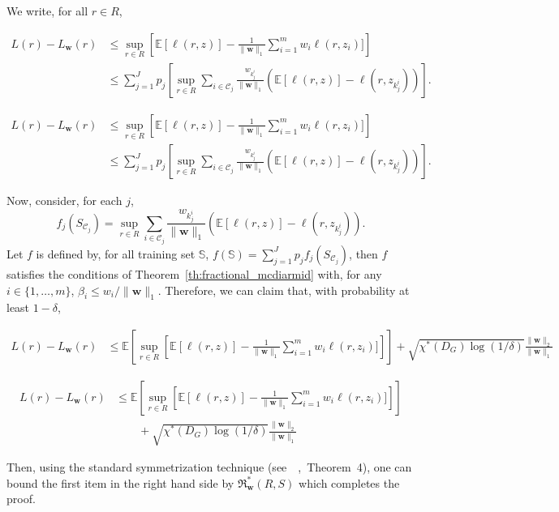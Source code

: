\documentclass[letterpaper]{article} %
\def\DoubleColumn{}
\def\DoubleColumnEnd{}
\def\SingleColumn{}
\def\SingleColumnEnd{}
\newcommand{\E}{\mathbb{E}}
\newcommand{\weight}{\mathbf{w}}
\newcommand{\empiricalrisk}[1]{L_{#1}}
\newcommand{\risk}{L}
\newcommand{\normo}[1]{\|#1\|_1}
\newcommand{\fcoloring}{\chi^*}
\newcommand{\set}[1]{\{#1\}}
\newcommand{\trainingset}{\mathbb{S}}
\newcommand{\citep}[3]{(#1\ \citeauthor{#3}\ \citeyear{#3},\ #2)}
\begin{document}
We write, for all $r\in R$,
\SingleColumn
\begin{equation}
  \label{eq:fractional_coloring_decomposition}
    \begin{aligned}
    \risk{}(r)-\empiricalrisk{\weight{}}(r)&\le \sup_{r\in R}\left[\E[\ell(r,z)] - \frac{1}{\normo{\weight{}}}\sum_{i=1}^m w_i\ell(r,z_i)]\right]\\
    &\le \sum_{j=1}^J p_j\left[ \sup_{r\in R}\sum_{i\in\mathcal{C}_j} \frac{w_{k_j^i}}{\normo{\weight{}}} (\E[\ell(r,z)] - \ell(r,z_{k_j^i}))\right].
    \end{aligned}
\end{equation}
\SingleColumnEnd
\DoubleColumn
\begin{equation}
  \label{eq:fractional_coloring_decomposition}
    \begin{aligned}
    \risk{}(r)-\empiricalrisk{\weight{}}(r)&\le \sup_{r\in R}\left[\E[\ell(r,z)] - \frac{1}{\normo{\weight{}}}\sum_{i=1}^m w_i\ell(r,z_i)]\right]\\
    &\le \sum_{j=1}^J p_j\left[ \sup_{r\in R}\sum_{i\in\mathcal{C}_j} \frac{w_{k_j^i}}{\normo{\weight{}}} (\E[\ell(r,z)] - \ell(r,z_{k_j^i}))\right].
    \end{aligned}
\end{equation}
\DoubleColumnEnd
Now, consider, for each $j$,
\[f_j(S_{\mathcal{C}_j}) = \sup_{r\in R}\sum_{i\in\mathcal{C}_j} \frac{w_{k_j^i}}{\normo{\weight{}}} (\E[\ell(r,z)] - \ell(r,z_{k_j^i})).\]
Let $f$ is defined by, for all training set $\trainingset{}$, $f(\trainingset{})=\sum_{j=1}^Jp_jf_j(S_{\mathcal{C}_j})$, then $f$ satisfies the conditions of Theorem~\ref{th:fractional_mcdiarmid} with, for any $i\in \set{1,\dots,m}$, $\beta_i\le w_i/\normo{\weight{}}$. Therefore, we can claim that, with probability at least $1-\delta$,
\SingleColumn
\begin{align*}
  \risk{}(r) - \empiricalrisk{\weight{}}(r)&\le \E\left[\sup_{r\in R}\left[\E[\ell(r,z)] - \frac{1}{\normo{\weight{}}}\sum_{i=1}^m w_i\ell(r,z_i)]\right]\right] + \sqrt{\fcoloring(D_G)\log(1/\delta)}\frac{\|\weight{}\|_2}{\normo{\weight{}}}
\end{align*}
\SingleColumnEnd
\DoubleColumn
\begin{align*}
  \risk{}(r) - \empiricalrisk{\weight{}}(r)&\le \E\left[\sup_{r\in R}\left[\E[\ell(r,z)] - \frac{1}{\normo{\weight{}}}\sum_{i=1}^m w_i\ell(r,z_i)]\right]\right]\\
  &\qquad+ \sqrt{\fcoloring(D_G)\log(1/\delta)}\frac{\|\weight{}\|_2}{\normo{\weight{}}}
\end{align*}
\DoubleColumnEnd
Then, using the standard symmetrization technique \citep{see}{Theorem~4}{Usunier2005}, one can bound the first item in the right hand side by $\mathfrak{R}_{\weight{}}^*(R,S)$ which completes the proof. 
\end{document}

